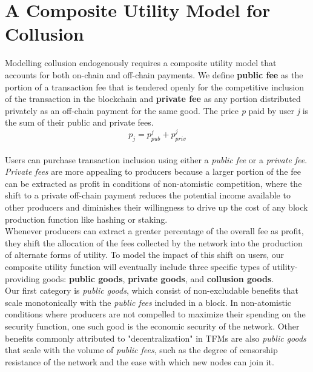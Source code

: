 \documentclass[11pt,a4paper]{llncs}
\begin{document}
\section{A Composite Utility Model for Collusion}

Modelling collusion endogenously requires a composite utility model that accounts for both on-chain and off-chain payments. We define \textbf{public fee} as the portion of a transaction fee that is tendered openly for the competitive inclusion of the transaction in the blockchain and \textbf{private fee} as any portion distributed privately as an off-chain payment for the same good. The price \textit{p} paid by user \textit{j} is the sum of their public and private fees.
\vspace{0.2cm} \\
$$
p_j = p_{pub}^j + p_{priv}^j
$$
\vspace{0.2cm} \\
Users can purchase transaction inclusion using either a \textit{public fee} or a \textit{private fee}. \textit{Private fees} are more appealing to producers because a larger portion of the fee can be extracted as profit in conditions of non-atomistic competition, where the shift to a private off-chain payment reduces the potential income available to other producers and diminishes their willingness to drive up the cost of any block production function like hashing or staking.
\vspace{0.2cm} \\
Whenever producers can extract a greater percentage of the overall fee as profit, they shift the allocation of the fees collected by the network into the production of alternate forms of utility. To model the impact of this shift on users, our composite utility function will eventually include three specific types of utility-providing goods: \textbf{public goods}, \textbf{private goods}, and \textbf{collusion goods}.
\vspace{0.2cm} \\
Our first category is \textit{public goods}, which consist of non-excludable benefits that scale monotonically with the \textit{public fees} included in a block. In non-atomistic conditions where producers are not compelled to maximize their spending on the security function, one such good is the economic security of the network. Other benefits commonly attributed to "decentralization" in TFMs are also \textit{public goods} that scale with the volume of \textit{public fees}, such as the degree of censorship resistance of the network and the ease with which new nodes can join it.
\end{document}
